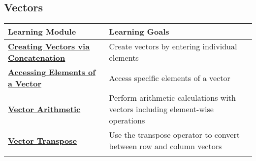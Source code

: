 \documentclass[11pt]{article}
\begin{document}
\subsection{Vectors}\label{vectors}

\begin{longtable}[]{@{}ll@{}}
\toprule
\begin{minipage}[b]{0.29\columnwidth}\raggedright\strut
\textbf{Learning Module}\strut
\end{minipage} & \begin{minipage}[b]{0.29\columnwidth}\raggedright\strut
\textbf{Learning Goals}\strut
\end{minipage}\tabularnewline
\midrule
\endhead
\begin{minipage}[t]{0.29\columnwidth}\raggedright\strut
\textbf{\href{http://youtu.be/2VNFqxmVqw8}{Creating Vectors via
Concatenation}}\strut
\end{minipage} & \begin{minipage}[t]{0.29\columnwidth}\raggedright\strut
Create vectors by entering individual elements\strut
\end{minipage}\tabularnewline
\begin{minipage}[t]{0.29\columnwidth}\raggedright\strut
\textbf{\href{http://youtu.be/GihLWwp8sBw}{Accessing Elements of a
Vector}}\strut
\end{minipage} & \begin{minipage}[t]{0.29\columnwidth}\raggedright\strut
Access specific elements of a vector\strut
\end{minipage}\tabularnewline
\begin{minipage}[t]{0.29\columnwidth}\raggedright\strut
\textbf{\href{http://youtu.be/t9Kla_YFdfs}{Vector Arithmetic}}\strut
\end{minipage} & \begin{minipage}[t]{0.29\columnwidth}\raggedright\strut
Perform arithmetic calculations with vectors including element-wise
operations\strut
\end{minipage}\tabularnewline
\begin{minipage}[t]{0.29\columnwidth}\raggedright\strut
\textbf{\href{http://youtu.be/USehPX2iEa4}{Vector Transpose}}\strut
\end{minipage} & \begin{minipage}[t]{0.29\columnwidth}\raggedright\strut
Use the transpose operator to convert between row and column
vectors\strut
\end{minipage}\tabularnewline
\begin{minipage}[t]{0.29\columnwidth}\raggedright\strut

\end{minipage}
\end{longtable}
\end{document}
